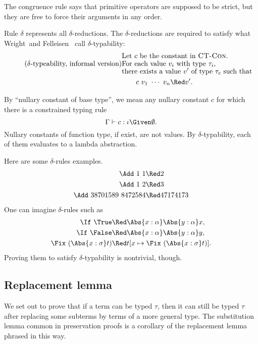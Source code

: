 \documentclass{amsart}
\theoremstyle{definition}
\begin{document}
The congruence rule  says that primitive operators
are supposed to be strict, but they are free to force their
arguments in any order.

Rule \textsc{$\delta$} represents all $\delta$-reductions. The
$\delta$-reductions are required to satisfy what
Wright~and Felleisen~\cite{Wright94} call $\delta$-typability:
\begin{align*}
&\text{Let $c$ be the constant in \textsc{CT-Con}.}\\[-4pt]
\tag{$\delta$-typeability, informal version}\label{delta-typability}
&\text{For each value $v_i$ with type $\tau_i$,}\\[-4pt]
&\text{there exists a value $v'$ of type $\tau_c$ such that}\\
&\hspace{2em}c~v_1~\cdots~v_n\Red v'.
\end{align*}

By ``nullary constant of base type'', we mean any nullary
constant $c$ for which there is a constrained typing rule
\[
\Gamma\vdash c:\iota\Given\emptyset.
\]
Nullary constants of function type, if exist, are not values. By
$\delta$-typability, each of them evaluates to a lambda
abstraction.

Here are some $\delta$-rules examples.
\begin{align*}
\Add~1~1&\Red2\\
\Add~1~2&\Red3\\
\Add~38701589~8472584&\Red47174173
\end{align*}
One can imagine $\delta$-rules such as
\begin{align*}
\If~\True &\Red\Abs{x:\alpha}\Abs{y:\alpha}x,\\
\If~\False&\Red\Abs{x:\alpha}\Abs{y:\alpha}y,\\
\Fix~(\Abs{x:\sigma} t)&\Red t[x\mapsto \Fix~(\Abs{x:\sigma} t)].
\end{align*}
Proving them to satisfy $\delta$-typability is nontrivial, though.

\subsection{Replacement lemma}
\label{sublem}

We set out to prove that if a term can be typed $\tau$, then it
can still be typed $\tau$ after replacing some subterms by
terms of a more general type. The substitution lemma common in
preservation proofs is a corollary of the replacement lemma
phrased in this way.
\end{document}
